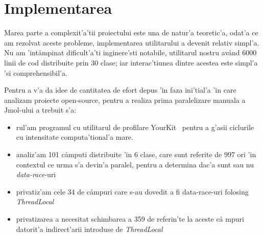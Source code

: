 \section{Implementarea}
Marea parte a complexit'a'tii proiectului este una de natur'a teoretic'a, odat'a
ce am rezolvat aceste probleme, implementarea utilitarului a devenit
relativ simpl'a. Nu am 'int\aa mpinat dificult'a'ti inginere'sti notabile,
utilitarul nostru av\aa nd 6000 linii de cod distribuite prin 30 clase; iar
interac'tiunea dintre acestea este simpl'a 'si comprehensibil'a.

Pentru a v'a da idee de cantitatea de efort depus 'in faza ini'tial'a 'in
care analizam proiecte open-source, pentru a realiza prima paralelizare manuala
a Jmol-ului a trebuit s'a:
\begin{itemize}
  \item rul'am programul cu utilitarul de profilare YourKit~\cite{YourKit}
  pentru a g'asii ciclurile cu intensitate computa'tional'a mare.
  \item analiz'am 101 c\aa mputi distribuite 'in 6 clase, care sunt referite de
  997 ori 'in contextul ce urma s'a devin'a paralel, pentru a determina dac'a
  sunt sau nu \emph{data-race}-uri
  \item privatiz'am cele 34 de c\aa mpuri care s-au dovedit a fi {data-race}-uri
  folosing \emph{ThreadLocal}
  \item privatizarea a necesitat schimbarea a 359 de referin'te la aceste c\aa
  mpuri datorit'a indirect'arii introduse de \emph{ThreadLocal}
\end{itemize}


